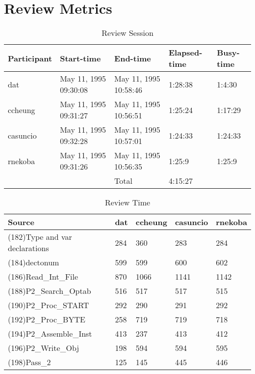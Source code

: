 \section{Review Metrics}
\begin{table}[hb]
\begin{center}
\begin{tabular}{|l|l|l|l|l|}
\hline
Participant & Start-time & End-time & Elapsed-time & Busy-time \\
\hline
dat & May 11, 1995 09:30:08 & May 11, 1995 10:58:46 & 1:28:38 & 1:4:30 \\
ccheung & May 11, 1995 09:31:27 & May 11, 1995 10:56:51 & 1:25:24 & 1:17:29 \\
casuncio & May 11, 1995 09:32:28 & May 11, 1995 10:57:01 & 1:24:33 & 1:24:33 \\
rnekoba & May 11, 1995 09:31:26 & May 11, 1995 10:56:35 & 1:25:9 & 1:25:9 \\
\hline
 & & Total & 4:15:27 & \\
\hline
\end{tabular}
\end{center}
\caption{Review Session}
\end{table}


\begin{table}[hb]
\begin{center}
\begin{tabular}{|l|l|l|l|l|}
\hline
Source & dat & ccheung & casuncio & rnekoba\\
\hline
(182)Type and var declarations & 284 & 360 & 283 & 284\\
(184)dectonum & 599 & 599 & 600 & 602\\
(186)Read\_Int\_File & 870 & 1066 & 1141 & 1142\\
(188)P2\_Search\_Optab & 516 & 517 & 517 & 515\\
(190)P2\_Proc\_START & 292 & 290 & 291 & 292\\
(192)P2\_Proc\_BYTE & 258 & 719 & 719 & 718\\
(194)P2\_Assemble\_Inst & 413 & 237 & 413 & 412\\
(196)P2\_Write\_Obj & 198 & 594 & 594 & 595\\
(198)Pass\_2 & 125 & 145 & 445 & 446\\
\hline
\end{tabular}
\end{center}
\caption{Review Time}
\end{table}

